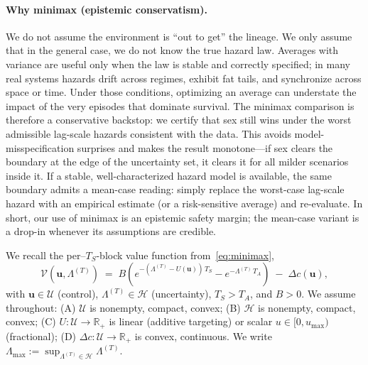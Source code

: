 \documentclass[11pt]{article}
\theoremstyle{upright}
\newcommand{\horizon}{\Lambda}
\newcommand{\Lmax}{\horizon^{(T)}_{\max}}
\newcommand{\Uset}{\mathcal{U}}
\newcommand{\Hset}{\mathcal{H}}
\newcommand{\hazT}[1]{\Lambda^{(#1)}}          %
\renewcommand{\Lmax}{\Lambda_{\max}}
\begin{document}
\paragraph{Why minimax (epistemic conservatism).}
We do not assume the environment is “out to get” the lineage. We only assume that in the general case, we do not know the true hazard law. Averages with 
variance are useful only when the law is stable and correctly specified; in many real systems hazards drift across regimes, exhibit fat tails, and synchronize 
across space or time. Under those conditions, optimizing an average can understate the impact of the very episodes that dominate survival. The minimax 
comparison is therefore a conservative backstop: we certify that sex still wins under the worst admissible lag-scale hazards consistent with the data. This 
avoids model-misspecification surprises and makes the result monotone—if sex clears the boundary at the edge of the uncertainty set, it clears it for all 
milder scenarios inside it. If a stable, well-characterized hazard model is available, the same boundary admits a mean-case reading: simply replace the 
worst-case lag-scale hazard with an empirical estimate (or a risk-sensitive average) and re-evaluate. In short, our use of minimax is an epistemic safety 
margin; the mean-case variant is a drop-in whenever its assumptions are credible.

We recall the per–$T_S$-block value function from~\eqref{eq:minimax},
\[
\mathcal V(\mathbf u,\hazT{T}) \;=\;
B\!\left(e^{-(\hazT{T}-U(\mathbf u))\,T_S}-e^{-\hazT{T}\,T_A}\right)\;-\;\Delta c(\mathbf u),
\]
with $\mathbf u\in\Uset$ (control), $\hazT{T}\in\Hset$ (uncertainty), $T_S>T_A$, and $B>0$.
We assume throughout: (A) $\Uset$ is nonempty, compact, convex; (B) $\Hset$ is nonempty, compact, convex;
(C) $U:\Uset\!\to\!\mathbb R_+$ is linear (additive targeting) or scalar $u\in[0,u_{\max})$ (fractional);
(D) $\Delta c:\Uset\!\to\!\mathbb R_+$ is convex, continuous. We write $\Lmax:=\sup_{\hazT{T}\in\Hset}\hazT{T}$.
\end{document}

